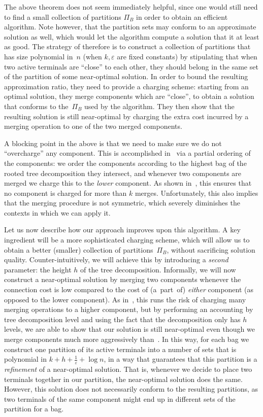 \documentclass[a4paper]{article}
\theoremstyle{plain}
\newcommand{\eps}{{\varepsilon}}
\begin{document}
The above theorem does not seem immediately helpful, since one would still need to
find a small collection of partitions $\Pi_B$ in order to obtain an efficient algorithm. 
Note however, that the partition sets may conform to an approximate solution as well, which
would let the algorithm compute a solution that it at least as good.
The strategy of \cite{bateni2011approximation} therefore is to
construct a collection of partitions that has size polynomial in~$n$ (when $k,\eps$ are
fixed constants) by stipulating that when two active terminals are ``close'' to
each other, they should belong in the same set of the partition of some near-optimal solution. In order to
bound the resulting approximation ratio, they need to provide a
charging scheme: starting from an optimal solution, they merge components which are
``close'', to obtain a solution that conforms to the~$\Pi_B$ used by the algorithm. 
They then show that the resulting solution is still near-optimal by charging the extra
cost incurred by a merging operation to one of the two merged components.

A blocking point in the above is that we need to make sure we do not
``overcharge'' any component. This is accomplished in~\cite{bateni2011approximation}
via a partial ordering of the components: we
order the components according to the highest bag of the rooted tree decomposition they
intersect, and whenever two components are merged we charge this to the
\emph{lower} component. As shown in~\cite{bateni2011approximation},
this ensures that no component is charged for more than
$k$ merges. Unfortunately, this also implies that the merging procedure is not
symmetric, which severely diminishes the contexts in which we can apply it.

Let us now describe how our approach improves upon this algorithm. A key
ingredient  will be a more sophisticated charging scheme, which will allow us
to obtain a better (smaller) collection of partitions~$\Pi_B$, without
sacrificing solution quality.  Counter-intuitively, we will achieve this by
introducing a \emph{second} parameter: the height $h$ of the tree
decomposition.  Informally, we will now construct a near-optimal solution by
merging two components whenever the connection cost is low compared to the cost of
(a~part~of) \emph{either} component (as opposed to the lower component). As 
in~\cite{bateni2011approximation}, this runs the risk of charging many merging
operations to a higher component, but by performing an accounting by tree
decomposition level and using the fact that the decomposition only has $h$
levels, we are able to show that our solution is still near-optimal even though
we merge components much more aggressively than~\cite{bateni2011approximation}.
In this way, for each bag we construct one partition of its active terminals into
a number of sets that is polynomial in $k+h+\frac{1}{\eps}+\log n$, in a way
that guarantees that this partition is a \emph{refinement} of a near-optimal
solution. That is, whenever we decide to place two terminals together in our
partition, the near-optimal solution does the same. However, this solution does
not necessarily conform to the resulting partitions, as two terminals of the same component
might end up in different sets of the partition for a bag.
\end{document}
